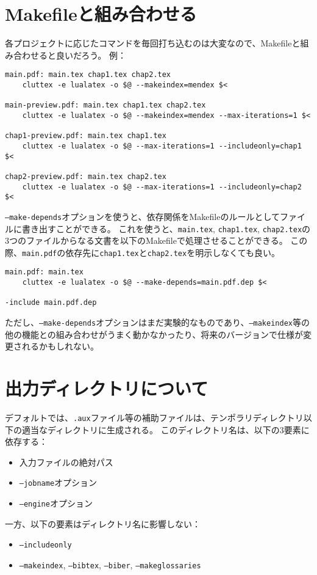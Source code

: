 \documentclass[a4paper]{ltjsreport}
\begin{document}
\section{Makefileと組み合わせる}\label{sec:makefile-example}
各プロジェクトに応じたコマンドを毎回打ち込むのは大変なので、Makefileと組み合わせると良いだろう。
例：
\begin{verbatim}
main.pdf: main.tex chap1.tex chap2.tex
    cluttex -e lualatex -o $@ --makeindex=mendex $<

main-preview.pdf: main.tex chap1.tex chap2.tex
    cluttex -e lualatex -o $@ --makeindex=mendex --max-iterations=1 $<

chap1-preview.pdf: main.tex chap1.tex
    cluttex -e lualatex -o $@ --max-iterations=1 --includeonly=chap1 $<

chap2-preview.pdf: main.tex chap2.tex
    cluttex -e lualatex -o $@ --max-iterations=1 --includeonly=chap2 $<
\end{verbatim}

\texttt{--make-depends}オプションを使うと、依存関係をMakefileのルールとしてファイルに書き出すことができる。
これを使うと、\texttt{main.tex}, \texttt{chap1.tex}, \texttt{chap2.tex}の3つのファイルからなる文書を以下のMakefileで処理させることができる。
この際、\texttt{main.pdf}の依存先に\texttt{chap1.tex}と\texttt{chap2.tex}を明示しなくても良い。

\begin{verbatim}
main.pdf: main.tex
    cluttex -e lualatex -o $@ --make-depends=main.pdf.dep $<

-include main.pdf.dep
\end{verbatim}

ただし、\texttt{--make-depends}オプションはまだ実験的なものであり、\texttt{--makeindex}等の他の機能との組み合わせがうまく動かなかったり、将来のバージョンで仕様が変更されるかもしれない。

\section{出力ディレクトリについて}
デフォルトでは、\texttt{.aux}ファイル等の補助ファイルは、テンポラリディレクトリ以下の適当なディレクトリに生成される。
このディレクトリ名は、以下の3要素に依存する：
\begin{itemize}
\item 入力ファイルの絶対パス
\item \texttt{--jobname}オプション
\item \texttt{--engine}オプション
\end{itemize}
一方、以下の要素はディレクトリ名に影響しない：
\begin{itemize}
\item \texttt{--includeonly}
\item \texttt{--makeindex}, \texttt{--bibtex}, \texttt{--biber}, \texttt{--makeglossaries}
\end{itemize}
\end{document}
